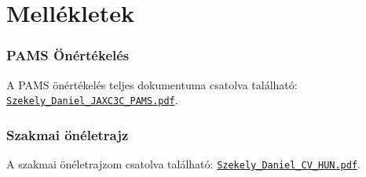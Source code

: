 \appendix
\chapter*{Mellékletek}
\setcounter{chapter}{\appendixnumber}

\subsection*{PAMS Önértékelés}

\noindent
A PAMS önértékelés teljes dokumentuma csatolva található: 
\href{run:figures/Szekely_Daniel_JAXC3C_PAMS.pdf}{\texttt{Szekely\_Daniel\_JAXC3C\_PAMS.pdf}}.
\subsection*{Szakmai önéletrajz}
\noindent
A szakmai önéletrajzom csatolva található:
\href{run:figures/Szekely_Daniel_CV_HUN.pdf}{\texttt{Szekely\_Daniel\_CV\_HUN.pdf}}.
